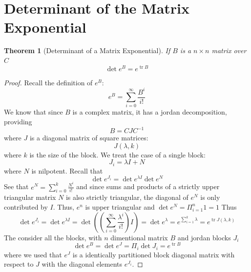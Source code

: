 \documentclass[a4paper, 12pt]{book}
\newtheorem{theorem}{Theorem}[chapter]
\begin{document}
\section{Determinant of the Matrix Exponential}
\begin{theorem}
	[Determinant of a Matrix Exponential]
	If \( B \) is a \( n\times n \) matrix over \( C \) \[
		\operatorname{det}e^B=e^{\operatorname{tr} B}
	\]
\end{theorem}
\begin{proof}
	Recall the definition of \( e^B \):
	\[
		e^B=\sum_{i=0}^{\infty} \frac{ B^i }{ i! }
	\]
	We know that since \( B \) is a complex matrix, it has a jordan decomposition, providing
	\[
		B=CJC^{-1}
	\]
	where \( J \) is a diagonal matrix of square matrices:
	\[ J(\lambda,k) \]
	where \( k \) is the size of the block. We treat the case of a single block:
	\[
		J_i=\lambda I+N
	\]
	where \( N \) is nilpotent. Recall that \[
		\operatorname{det} e^{J_i} =\operatorname{det}e^{\lambda I}\operatorname{det}e^N
	\]
	See that $e^N=\sum_{i=0}^{k} \frac{ N^i }{ i! } $ and since sums and products of a strictly upper triangular matrix \(  N \) is also strictly triangular, the diagonal of \( e^N \) is only contributed by \( I \). Thus, \( e^n \) is upper triangular and \( \operatorname{det} e^N = \Pi_{i=1}^{n} 1 =1\)
	Thus \[
		\operatorname{det}e^{J_i}=\operatorname{det}e^{\lambda I}= \operatorname{det} ((\sum_{i=0}^{\infty} \frac{ \lambda^i }{ i! } )I)=\operatorname{det} e^\lambda = e^{\sum_{i=1}^{k} \lambda} = e^{\operatorname{tr} J(\lambda,k)}
	\]
	The consider all the blocks, with \( n \) dimentional matrix \( B \) and jordan blocks \( J_i \)
	\[
		\operatorname{det}e^B=\operatorname{det}e^J= \Pi_i \operatorname{det} J_i  =e^{\operatorname{tr} B}
	\]
	where we used that \( e^J \) is a identically partitioned block diagonal matrix with respect to \( J \) with the diagonal elements \( e^{J_i} \).

\end{proof}
\end{document}
